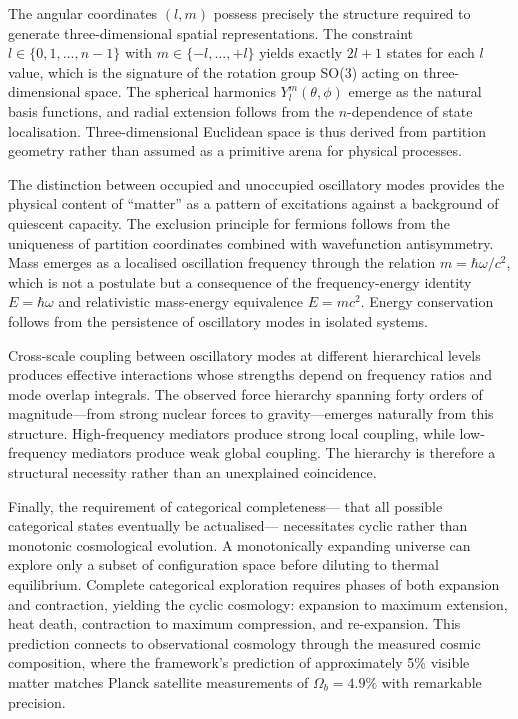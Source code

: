 \documentclass[11pt,a4paper]{article}
\theoremstyle{remark}
\begin{document}
The angular coordinates $(l, m)$ possess precisely the structure required to generate three-dimensional spatial representations. The constraint $l \in \{0, 1, ..., n-1\}$ with $m \in \{-l, ..., +l\}$ yields exactly $2l+1$ states for each $l$ value, which is the signature of the rotation group SO(3) acting on three-dimensional space. The spherical harmonics $Y_l^m(\theta, \phi)$ emerge as the natural basis functions, and radial extension follows from the $n$-dependence of state localisation. Three-dimensional Euclidean space is thus derived from partition geometry rather than assumed as a primitive arena for physical processes.

The distinction between occupied and unoccupied oscillatory modes provides the physical content of ``matter'' as a pattern of excitations against a background of quiescent capacity. The exclusion principle for fermions follows from the uniqueness of partition coordinates combined with wavefunction antisymmetry. Mass emerges as a localised oscillation frequency through the relation $m = \hbar\omega/c^2$, which is not a postulate but a consequence of the frequency-energy identity $E = \hbar\omega$ and relativistic mass-energy equivalence $E = mc^2$. Energy conservation follows from the persistence of oscillatory modes in isolated systems.

Cross-scale coupling between oscillatory modes at different hierarchical levels produces effective interactions whose strengths depend on frequency ratios and mode overlap integrals. The observed force hierarchy spanning forty orders of magnitude—from strong nuclear forces to gravity—emerges naturally from this structure. High-frequency mediators produce strong local coupling, while low-frequency mediators produce weak global coupling. The hierarchy is therefore a structural necessity rather than an unexplained coincidence.

Finally, the requirement of categorical completeness— that all possible categorical states eventually be actualised— necessitates cyclic rather than monotonic cosmological evolution. A monotonically expanding universe can explore only a subset of configuration space before diluting to thermal equilibrium. Complete categorical exploration requires phases of both expansion and contraction, yielding the cyclic cosmology: expansion to maximum extension, heat death, contraction to maximum compression, and re-expansion. This prediction connects to observational cosmology through the measured cosmic composition, where the framework's prediction of approximately 5\% visible matter matches Planck satellite measurements of $\Omega_b = 4.9\%$ with remarkable precision.
\end{document}
